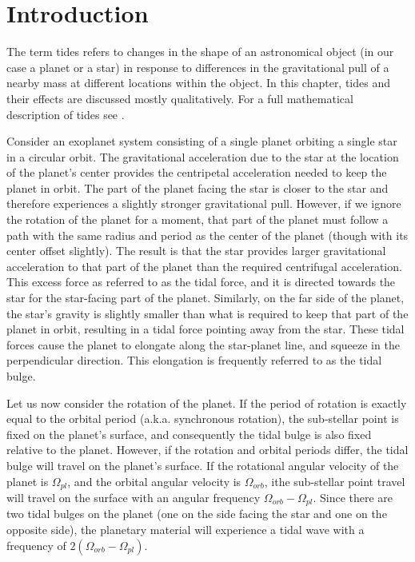 \section{Introduction}
%
\label{sec:introduction}

The term tides refers to changes in the shape of an astronomical object (in our
case a planet or a star) in response to differences in the gravitational pull of
a nearby mass at different locations within the object. In this chapter, tides
and their effects are discussed mostly qualitatively. For a full mathematical
description of tides see \cite{Murray_Dermott_book}.

Consider an exoplanet system consisting of a single planet orbiting a single
star in a circular orbit. The gravitational acceleration due to the star at the
location of the planet's center provides the centripetal acceleration needed to
keep the planet in orbit. The part of the planet facing the star is closer to
the star and therefore experiences a slightly stronger gravitational pull.
However, if we ignore the rotation of the planet for a moment, that part of the
planet must follow a path with the same radius and period as the center of the
planet (though with its center offset slightly). The result is that the star
provides larger gravitational acceleration to that part of the planet than the
required centrifugal acceleration. This excess force as referred to as the tidal
force, and it is directed towards the star for the star-facing part of the
planet. Similarly, on the far side of the planet, the star's gravity is slightly
smaller than what is required to keep that part of the planet in orbit,
resulting in a tidal force pointing away from the star. These tidal forces cause
the planet to elongate along the star-planet line, and squeeze in the
perpendicular direction. This elongation is frequently referred to as the tidal
bulge.

Let us now consider the rotation of the planet. If the period of rotation is
exactly equal to the orbital period (a.k.a. synchronous rotation), the
sub-stellar point is fixed on the planet's surface, and consequently the tidal
bulge is also fixed relative to the planet. However, if the rotation and orbital
periods differ, the tidal bulge will travel on the planet's surface. If the
rotational angular velocity of the planet is $\Omega_{pl}$, and the orbital
angular velocity is $\Omega_{orb}$, ithe sub-stellar point travel will travel on
the surface with an angular frequency $\Omega_{orb} - \Omega_{pl}$. Since there
are two tidal bulges on the planet (one on the side facing the star and one on
the opposite side), the planetary material will experience a tidal wave with a
frequency of $2(\Omega_{orb} - \Omega_{pl})$.

